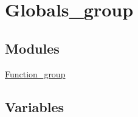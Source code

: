 \hypertarget{group__globals__group}{}\section{Globals\+\_\+group}
\label{group__globals__group}
\subsection*{Modules}
\begin{DoxyCompactItemize}
\item 
\mbox{\hyperlink{group__function__group}{Function\+\_\+group}}
\end{DoxyCompactItemize}
\subsection*{Variables}
